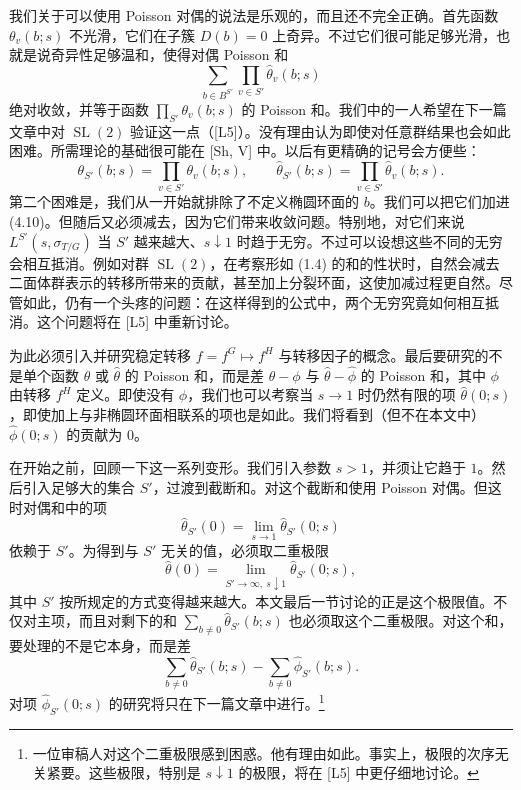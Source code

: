 我们关于可以使用 Poisson 对偶的说法是乐观的，而且还不完全正确。首先函数 $\theta_v(b;s)$ 不光滑，它们在子簇 $D(b)=0$ 上奇异。不过它们很可能足够光滑，也就是说奇异性足够温和，使得对偶 Poisson 和
\begin{equation}\tag{4.11}
\sum_{b\in B^{S'}}\prod_{v\in S'}\hat\theta_v(b;s)
\end{equation}
绝对收敛，并等于函数 $\prod_{S'}\theta_v(b;s)$ 的 Poisson 和。我们中的一人希望在下一篇文章中对 $\operatorname{SL}(2)$ 验证这一点（[L5]）。没有理由认为即使对任意群结果也会如此困难。所需理论的基础很可能在 [Sh, V] 中。以后有更精确的记号会方便些：
\begin{equation}\tag{4.12}
\theta_{S'}(b;s)=\prod_{v\in S'}\theta_v(b;s),
\qquad
\hat\theta_{S'}(b;s)=\prod_{v\in S'}\hat\theta_v(b;s).
\end{equation}
第二个困难是，我们从一开始就排除了不定义椭圆环面的 $b$。我们可以把它们加进 (4.10)。但随后又必须减去，因为它们带来收敛问题。特别地，对它们来说 $L^{S'}(s,\sigma_{T/G})$ 当 $S'$ 越来越大、$s\downarrow1$ 时趋于无穷。不过可以设想这些不同的无穷会相互抵消。例如对群 $\operatorname{SL}(2)$，在考察形如 (1.4) 的和的性状时，自然会减去二面体群表示的转移所带来的贡献，甚至加上分裂环面，这使加减过程更自然。尽管如此，仍有一个头疼的问题：在这样得到的公式中，两个无穷究竟如何相互抵消。这个问题将在 [L5] 中重新讨论。

为此必须引入并研究稳定转移 $f=f^G\mapsto f^H$ 与转移因子的概念。最后要研究的不是单个函数 $\theta$ 或 $\hat\theta$ 的 Poisson 和，而是差 $\theta-\phi$ 与 $\hat\theta-\hat\phi$ 的 Poisson 和，其中 $\phi$ 由转移 $f^H$ 定义。即使没有 $\phi$，我们也可以考察当 $s\to1$ 时仍然有限的项 $\hat\theta(0;s)$，即使加上与非椭圆环面相联系的项也是如此。我们将看到（但不在本文中）$\hat\phi(0;s)$ 的贡献为 $0$。

在开始之前，回顾一下这一系列变形。我们引入参数 $s>1$，并须让它趋于 $1$。然后引入足够大的集合 $S'$，过渡到截断和。对这个截断和使用 Poisson 对偶。但这时对偶和中的项
\[
\hat\theta_{S'}(0)=\lim_{s\to1}\hat\theta_{S'}(0;s)
\]
依赖于 $S'$。为得到与 $S'$ 无关的值，必须取二重极限
\begin{equation}\tag{4.13}
\hat\theta(0)=\lim_{S'\to\infty,\ s\downarrow1}\hat\theta_{S'}(0;s),
\end{equation}
其中 $S'$ 按所规定的方式变得越来越大。本文最后一节讨论的正是这个极限值。不仅对主项，而且对剩下的和 $\sum_{b\ne0}\hat\theta_{S'}(b;s)$ 也必须取这个二重极限。对这个和，要处理的不是它本身，而是差
\[
\sum_{b\ne0}\hat\theta_{S'}(b;s)-\sum_{b\ne0}\hat\phi_{S'}(b;s).
\]
对项 $\hat\phi_{S'}(0;s)$ 的研究将只在下一篇文章中进行。\footnote{一位审稿人对这个二重极限感到困惑。他有理由如此。事实上，极限的次序无关紧要。这些极限，特别是 $s\downarrow1$ 的极限，将在 [L5] 中更仔细地讨论。}
